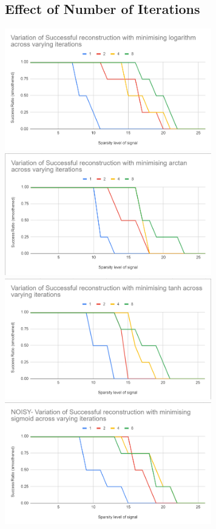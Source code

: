 \documentclass[a4paper,14pt]{article}
\numberwithin{definition}{section}
\numberwithin{mytheorem}{subsection}
\begin{document}
\subsection{Effect of Number of Iterations}

\begin{center}
    \includegraphics[width=9cm]{log_iterations_noisy.png}
    \includegraphics[width=9cm]{atan_iterations_noisy.png}
    \includegraphics[width=9cm]{tanh_iterations_noisy.png}
    \includegraphics[width=9cm]{sigmoid_iterations_noisy.png}
\end{center}
\end{document}
